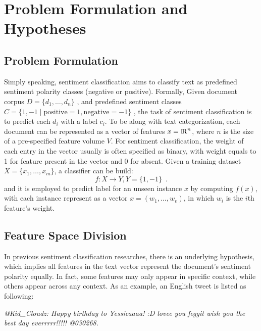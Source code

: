 \documentclass{llncs}
\begin{document}
\section{Problem Formulation and Hypotheses}
\label{problem}

\subsection{Problem Formulation}
\label{formulation}

Simply speaking, sentiment classification aims to classify text as predefined sentiment polarity classes (negative or positive).  
Formally, Given document corpus $ D=\lbrace d_{1},\dots ,d_{n} \rbrace$ , and predefined sentiment classes $ C=\lbrace 1,-1\mid \mathrm{positive}=1,\mathrm{negative}=-1 \rbrace$ , the task of sentiment classification is to predict each $ d_{i} $ with a label $ c_{i} $. 
To be along with text categorization, each document can be represented as a vector of features $ x={\rm I\!R}^{n} $, where $ n $ is the size of a pre-specified feature volume $ V $. 
For sentiment classification, the weight of each entry in the vector usually is often specified as binary, with weight equals to 1 for feature present in the vector and 0 for absent. 
Given a training dataset $ X=\lbrace x_{1},\dots,x_{m} \rbrace $, a classifier can be build:
\begin{equation}
\label{e1}
  f:X \longrightarrow Y, Y=\lbrace 1,-1 \rbrace \enspace .
\end{equation} 
and it is employed  to predict label for an unseen instance $ x $ by computing $ f \left( x \right)   $, with each instance represent as a vector $ x=\left( w_{1},\dots,w_{v} \right)  $, in which $ w_{i} $ is the $ i $th feature’s weight. 

\subsection{Feature Space Division}
\label{division}

In previous sentiment classification researches, there is an underlying hypothesis, which implies all features in the text vector represent the document's sentiment polarity equally. 
In fact, some features may only appear in specific context, while others appear across any context. 
As an example, an English tweet is listed as following:

\textit{@Kid\_Cloudz: Happy birthday to Yessicaaaa! :D lovee you feggit wish you the best day everrrrr!!!!! @030268.}
\end{document}
